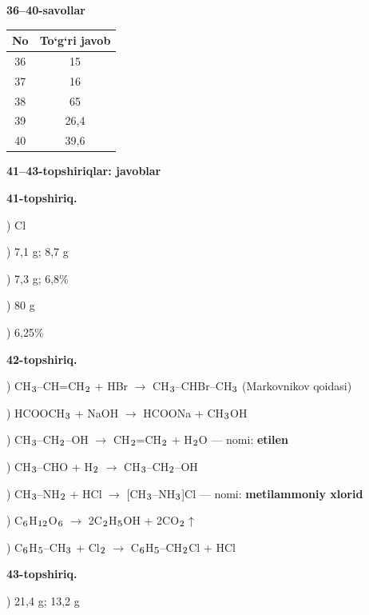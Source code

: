 \documentclass[11pt,a4paper]{article}
\renewcommand{\textsubscript}[1]{\ensuremath{_{\text{\fontsize{8}{8}\selectfont #1}}}}
\begin{document}
\noindent\textbf{36--40-savollar}\par\smallskip
\noindent\begin{tabular}{|c|c|}\hline \textbf{No} & \textbf{To`g`ri javob}\\\hline
36 & 15\\\hline
37 & 16\\\hline
38 & 65\\\hline
39 & 26,4\\\hline
40 & 39,6\\\hline
\end{tabular}\par\medskip
\noindent\textbf{41--43-topshiriqlar: javoblar}\par\smallskip
\noindent\textbf{41-topshiriq.}\par
{}) Cl\par
{}) 7,1 g; 8,7 g\par
{}) 7,3 g; 6,8\%\par
{}) 80 g\par
{}) 6,25\%\par
\noindent\textbf{42-topshiriq.}\par
{}) CH\textsubscript{3}--CH=CH\textsubscript{2} + HBr $\to$ CH\textsubscript{3}--CHBr--CH\textsubscript{3} (Markovnikov qoidasi)\par
{}) HCOOCH\textsubscript{3} + NaOH $\to$ HCOONa + CH\textsubscript{3}OH\par
{}) CH\textsubscript{3}--CH\textsubscript{2}--OH $\to$ CH\textsubscript{2}=CH\textsubscript{2} + H\textsubscript{2}O --- nomi: \textbf{etilen}\par
{}) CH\textsubscript{3}--CHO + H\textsubscript{2} $\to$ CH\textsubscript{3}--CH\textsubscript{2}--OH\par
{}) CH\textsubscript{3}--NH\textsubscript{2} + HCl $\to$ [CH\textsubscript{3}--NH\textsubscript{3}]Cl --- nomi: \textbf{metilammoniy xlorid}\par
{}) C\textsubscript{6}H\textsubscript{12}O\textsubscript{6} $\to$ 2C\textsubscript{2}H\textsubscript{5}OH + 2CO\textsubscript{2}$\uparrow$\par
{}) C\textsubscript{6}H\textsubscript{5}--CH\textsubscript{3} + Cl\textsubscript{2} $\to$ C\textsubscript{6}H\textsubscript{5}--CH\textsubscript{2}Cl + HCl\par
\noindent\textbf{43-topshiriq.}\par
{}) 21,4 g; 13,2 g\par
\end{document}
